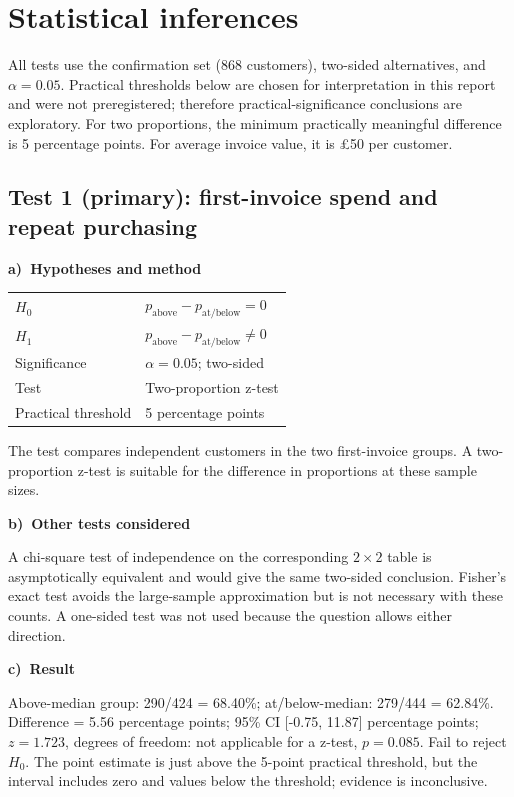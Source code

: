 \documentclass[10pt,a4paper,twocolumn]{article}
\newcommand{\tpart}[2]{\par\needspace{12\baselineskip}\smallskip\textbf{#1)~#2}\par}
\begin{document}
\section{Statistical inferences}
All tests use the confirmation set (868 customers), two-sided alternatives, and $\alpha=0.05$. Practical thresholds below are chosen for interpretation in this report and were not preregistered; therefore practical-significance conclusions are exploratory. For two proportions, the minimum practically meaningful difference is 5 percentage points. For average invoice value, it is £50 per customer.
\subsection*{Test 1 (primary): first-invoice spend and repeat purchasing}
\tpart{a}{Hypotheses and method}
\begin{tabularx}{\linewidth}{@{}K{3.2cm} Y@{}}
\toprule
$H_0$ & $p_{\mathrm{above}}-p_{\mathrm{at/below}}=0$\\
$H_1$ & $p_{\mathrm{above}}-p_{\mathrm{at/below}}\ne0$\\
Significance & $\alpha=0.05$; two-sided\\
Test & Two-proportion z-test\\
Practical threshold & 5 percentage points\\
\bottomrule
\end{tabularx}
The test compares independent customers in the two first-invoice groups. A two-proportion z-test is suitable for the difference in proportions at these sample sizes.
\tpart{b}{Other tests considered}
A chi-square test of independence on the corresponding $2\times2$ table is asymptotically equivalent and would give the same two-sided conclusion. Fisher's exact test avoids the large-sample approximation but is not necessary with these counts. A one-sided test was not used because the question allows either direction.
\tpart{c}{Result}
Above-median group: 290/424 = 68.40\%; at/below-median: 279/444 = 62.84\%. Difference = 5.56 percentage points; 95\% CI [-0.75, 11.87] percentage points; $z=1.723$, degrees of freedom: not applicable for a z-test, $p=0.085$. Fail to reject $H_0$. The point estimate is just above the 5-point practical threshold, but the interval includes zero and values below the threshold; evidence is inconclusive.
\end{document}
